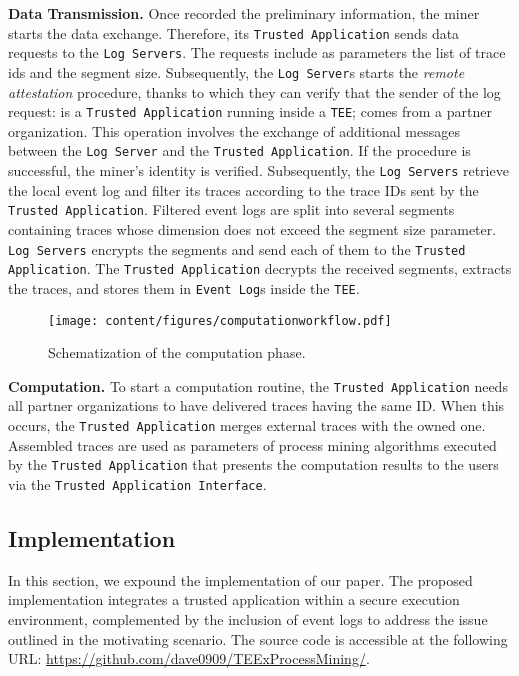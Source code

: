 \textbf{Data Transmission.} Once recorded the preliminary information, the miner starts the data exchange. Therefore, its \texttt{Trusted Application} sends data requests to the \texttt{Log Servers}. The requests include as parameters the list of trace ids and the segment size. Subsequently, the \texttt{Log Server}s starts the \textit{remote attestation} procedure, thanks to which they can verify that the sender of the log request: is a \texttt{Trusted Application} running inside a \texttt{TEE}; comes from a partner organization. This operation involves the exchange of additional messages between the \texttt{Log Server} and the \texttt{Trusted Application}. If the procedure is successful, the miner's identity is verified.
Subsequently, the \texttt{Log Servers} retrieve the local event log and filter its traces according to the trace IDs sent by the \texttt{Trusted Application}. Filtered event logs are split into several segments containing traces whose dimension does not exceed the segment size parameter. \texttt{Log Servers} encrypts the segments and send each of them to the \texttt{Trusted Application}. The \texttt{Trusted Application} decrypts the received segments, extracts the traces, and stores them in \texttt{Event Log}s inside the \texttt{TEE}.

\begin{wrapfigure}[9]{r}{0.33\textwidth}
   \vspace{-2em}
  \centering
  \texttt{[image: content/figures/computationworkflow.pdf]}
  \caption[A gull]{Schematization of the computation phase.}
  \vspace{-6pt}
\end{wrapfigure}
\textbf{Computation.} To start a computation routine, the \texttt{Trusted Application} needs all partner organizations to have delivered traces having the same ID. When this occurs, the \texttt{Trusted Application} merges external traces with the owned one. Assembled traces are used as parameters of process mining algorithms executed by the \texttt{Trusted Application} that presents the computation results to the users via the \texttt{Trusted Application Interface}.







\subsection{Implementation}
\label{sec:implementation:details}
In this section, we expound the implementation of our paper. The proposed implementation integrates a trusted application within a secure execution environment, complemented by the inclusion of event logs to address the issue outlined in the motivating scenario. The source code is accessible at the following URL: \url{https://github.com/dave0909/TEExProcessMining/}.


